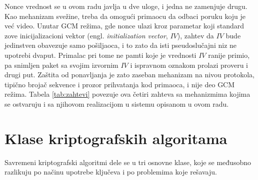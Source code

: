 \smallbreak
Nonce vrednost se u ovom radu javlja u dve uloge, i jedna ne zamenjuje drugu. Kao mehanizam svežine, treba da omogući primaocu da odbaci poruku koju je već video. Unutar GCM režima, gde nonce ulazi kroz parametar koji standard zove inicijalizacioni vektor (engl. \textit{initialization vector}, $IV$), zahtev da $IV$ bude jedinstven obavezuje samo pošiljaoca, i to zato da isti pseudoslučajni niz ne upotrebi dvaput. Primalac pri tome ne pamti koje je vrednosti $IV$ ranije primio, pa snimljen paket sa svojim izvornim $IV$ i ispravnom oznakom prolazi proveru i drugi put. Zaštita od ponavljanja je zato zaseban mehanizam na nivou protokola, tipično brojač sekvence i prozor prihvatanja kod primaoca, i nije deo GCM režima.
\smallbreak
Tabela \ref{tab:zahtevi} povezuje ova četiri zahteva sa mehanizmima kojima se ostvaruju i sa njihovom realizacijom u sistemu opisanom u ovom radu.

\begin{table}[H]
\caption{Sigurnosni zahtevi, mehanizmi i njihova realizacija u ovom radu}
\centering
\setlength{\tabcolsep}{5pt}
\renewcommand{\arraystretch}{1.4}
\label{tab:zahtevi}
\end{table}

\section{Klase kriptografskih algoritama}
\label{sec:klase_algoritama}

Savremeni kriptografski algoritmi dele se u tri osnovne klase, koje se međusobno razlikuju po načinu upotrebe ključeva i po problemima koje rešavaju.

